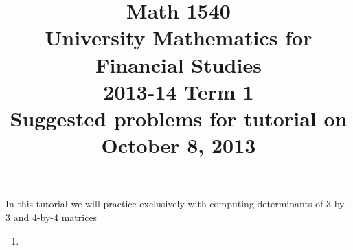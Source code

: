 \documentclass[8pt]{article} %
\title{Math 1540\\University Mathematics for Financial Studies\\2013-14 Term 1\\Suggested problems for tutorial on\\October 8, 2013}
\begin{document}
\maketitle
In this tutorial we will practice exclusively with computing determinants of 3-by-3 and 4-by-4 matrices
\begin{enumerate}
	\newcommand{\myexplain}[3]{#1\xrightarrow{\text{#2}}#3}
	\newcommand{\myexplainf}[4]{#1\xrightarrow{\begin{subarray}{c}\text{#2}\\\text{#3}\end{subarray}}#4}
	\newcommand{\myfrac}[2]{^#1/_#2}
\item 
\end{enumerate}
\end{document}

